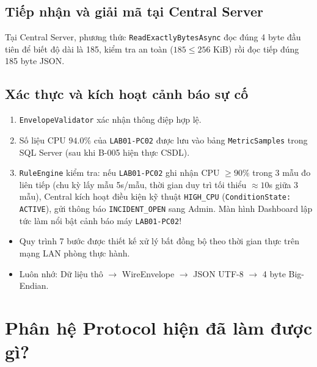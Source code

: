 \documentclass[12pt,a4paper]{article}
\begin{document}
\subsection{Tiếp nhận và giải mã tại Central Server}
Tại Central Server, phương thức \texttt{ReadExactlyBytesAsync} đọc đúng 4 byte đầu tiên để biết độ dài là 185, kiểm tra an toàn ($185 \le 256\text{ KiB}$) rồi đọc tiếp đúng 185 byte JSON.

\subsection{Xác thực và kích hoạt cảnh báo sự cố}
\begin{enumerate}
  \item \texttt{EnvelopeValidator} xác nhận thông điệp hợp lệ.
  \item Số liệu CPU $94.0\%$ của \texttt{LAB01-PC02} được lưu vào bảng \texttt{MetricSamples} trong SQL Server (sau khi B-005 hiện thực CSDL).
  \item \texttt{RuleEngine} kiểm tra: nếu \texttt{LAB01-PC02} ghi nhận CPU $\ge 90\%$ trong 3 mẫu đo liên tiếp (chu kỳ lấy mẫu 5s/mẫu, thời gian duy trì tối thiểu $\approx 10$s giữa 3 mẫu), Central kích hoạt điều kiện kỹ thuật \texttt{HIGH\_CPU} (\texttt{ConditionState: ACTIVE}), gửi thông báo \texttt{INCIDENT\_OPEN} sang Admin. Màn hình Dashboard lập tức làm nổi bật cảnh báo máy \texttt{LAB01-PC02}!
\end{enumerate}

\begin{takeawaybox}
\begin{itemize}[leftmargin=1.5em, itemsep=1pt]
  \item Quy trình 7 bước được thiết kế xử lý bất đồng bộ theo thời gian thực trên mạng LAN phòng thực hành.
  \item Luôn nhớ: Dữ liệu thô $\rightarrow$ WireEnvelope $\rightarrow$ JSON UTF-8 $\rightarrow$ 4 byte Big-Endian.
\end{itemize}
\end{takeawaybox}

\section{Phân hệ Protocol hiện đã làm được gì?}
\end{document}
